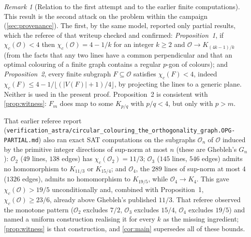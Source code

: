 \documentclass[11pt,a4paper]{article}
\theoremstyle{plain}
\theoremstyle{definition}
\theoremstyle{remark}
\newtheorem{remark}[theorem]{Remark}
\newcommand{\cO}{\mathcal O}
\newcommand{\chic}{\chi_c}
\newcommand{\Kc}[2]{K_{#1/#2}}
\newcommand{\Fin}[1]{F_{#1}}
\begin{document}
\begin{remark}[Relation to the first attempt and to the earlier finite computations]\label{rem:previous}
This result is the second attack on the problem within the campaign (\cref{sec:provenance}). The first, by the same model, reported only partial results, which the referee of that writeup checked and confirmed: \emph{Proposition~1}, if $\chic(\cO)<4$ then $\chic(\cO)=4-1/k$ for an integer $k\ge2$ and $\cO\to\Kc{(4k-1)}{k}$ (from the facts that any two lines have a common perpendicular and that an optimal colouring of a finite graph contains a regular $p$-gon of colours); and \emph{Proposition~2}, every finite subgraph $F\subseteq\cO$ satisfies $\chic(F)<4$, indeed $\chic(F)\le 4-1/\lfloor(|V(F)|+1)/4\rfloor$, by projecting the lines to a generic plane. Neither is used in the present proof. Proposition~2 is consistent with \cref{prop:witness}: $\Fin m$ does map to some $\Kc pq$ with $p/q<4$, but only with $p>m$.

That earlier referee report (\texttt{verification\_astra/circular\_colouring\_the\_orthogonality\_graph.OPG-PARTIAL.md}) also ran exact SAT computations on the subgraphs $\cO_n$ of $\cO$ induced by the primitive integer directions of sup-norm at most $n$ (these are Ghebleh's $G_n$): $\cO_2$ ($49$ lines, $138$ edges) has $\chic(\cO_2)=11/3$; $\cO_3$ ($145$ lines, $546$ edges) admits no homomorphism to $\Kc{11}{3}$ or $\Kc{15}{4}$; and $\cO_4$, the $289$ lines of sup-norm at most $4$ ($1326$ edges), admits no homomorphism to $\Kc{19}{5}$, while $\cO_4\to K_4$. This gave $\chic(\cO)>19/5$ unconditionally and, combined with Proposition~1, $\chic(\cO)\ge 23/6$, already above Ghebleh's published $11/3$. That referee observed the monotone pattern ($\cO_2$ excludes $7/2$, $\cO_3$ excludes $15/4$, $\cO_4$ excludes $19/5$) and named a uniform construction realising it for every $k$ as the missing ingredient; \cref{prop:witness} is that construction, and \cref{cor:main} supersedes all of these bounds.
\end{remark}
\end{document}
